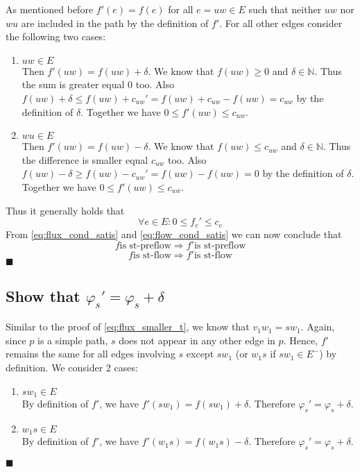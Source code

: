 \documentclass[10pt,a4paper]{article}
\begin{document}
	As mentioned before $f'(e) = f(e)$ for all $e = uw \in E$ such that neither $uw$ nor $wu$ are included in the path by the definition of $f'$. For all other edges consider the following two cases:
	\begin{enumerate}
		\item $uw \in E$ \\
		Then $f'(uw) = f(uw) + \delta$. We know that $f(uw) \geq 0$ and $\delta \in \mathbb{N}$. Thus the sum is greater equal 0 too. Also $f(uw) + \delta \leq f(uw) + c_{uw}' = f(uw) + c_{uw} - f(uw) = c_{uw}$ by the definition of $\delta$. Together we have $0 \leq f'(uw) \leq c_{uw}$.
		
		\item $wu \in E$ \\
		Then $f'(uw) = f(uw) - \delta$. We know that $f(uw) \leq c_{uw}$ and $\delta \in \mathbb{N}$. Thus the difference is smaller equal $c_{uw}$ too. Also $f(uw) - \delta \geq f(uw) - c_{uw}' = f(uw) - f(uw) = 0$ by the definition of $\delta$. Together we have $0 \leq f'(uw) \leq c_{uw}$.
	\end{enumerate}
	Thus it generally holds that
	\begin{equation}
	\label{eq:flow_cond_satis}
	\forall e \in E: 0 \leq f_e' \leq c_e
	\end{equation}
	From \ref{eq:flux_cond_satis} and \ref{eq:flow_cond_satis} we can now conclude that
	$$ f \text{is st-preflow} \Rightarrow f' \text{is st-preflow}$$
	$$ f \text{is st-flow} \Rightarrow f' \text{is st-flow}$$
	\hfill $\blacksquare$
	
	\subsection*{Show that $\varphi_s' = \varphi_s + \delta$}
	Similar to the proof of \ref{eq:flux_smaller_t}, we know that $v_1w_1 = sw_1$. Again, since $p$ is a simple path, $s$ does not appear in any other edge in $p$. Hence, $f'$ remains the same for all edges involving $s$ except $sw_1$ (or $w_1s$ if $sw_1 \in E^-$) by definition. We consider 2 cases:
	\begin{enumerate}
		\item $sw_1 \in E$ \\
		By definition of $f'$, we have $f'(sw_1) = f(sw_1) + \delta$. Therefore $\varphi_s' = \varphi_s + \delta$.
		\item $w_1s \in E$ \\
		By definition of $f'$, we have $f'(w_1s) = f(w_1s) - \delta$. Therefore $\varphi_s' = \varphi_s + \delta$.
	\end{enumerate} \hfill $\blacksquare$
	
\end{document}
